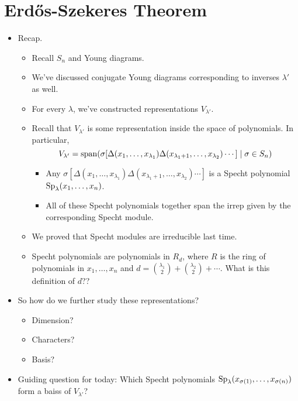 \documentclass[../notes.tex]{subfiles}
\begin{document}
\section{Erd\H{o}s-Szekeres Theorem}
\begin{itemize}
    \item {}Recap.
    \begin{itemize}
        \item Recall $S_n$ and Young diagrams.
        \item We've discussed conjugate Young diagrams corresponding to inverses $\lambda'$ as well.
        \item For every $\lambda$, we've constructed representations $V_{\lambda'}$.
        \item Recall that $V_{\lambda'}$ is some representation inside the space of polynomials. In particular,
        \begin{equation*}
            V_{\lambda'} = \operatorname{span}(\sigma[\Delta(x_1,\dots,x_{\lambda_1})\Delta(x_{\lambda_1+1},\dots,x_{\lambda_2})\cdots]\mid\sigma\in S_n)
        \end{equation*}
        \begin{itemize}
            \item Any $\sigma[\Delta(x_1,\dots,x_{\lambda_1})\Delta(x_{\lambda_1+1},\dots,x_{\lambda_2})\cdots]$ is a Specht polynomial $\operatorname{Sp}_\lambda(x_1,\dots,x_n)$.
            \item All of these Specht polynomials together span the irrep given by the corresponding Specht module.
        \end{itemize}
        \item We proved that Specht modules are irreducible last time.
        \item Specht polynomials are polynomials in $R_d$, where $R$ is the ring of polynomials in $x_1,\dots,x_n$ and $d=\binom{\lambda_1}{2}+\binom{\lambda_2}{2}+\cdots$. What is this definition of $d$??
    \end{itemize}
    \item So how do we further study these representations?
    \begin{itemize}
        \item Dimension?
        \item Characters?
        \item Basis?
    \end{itemize}
    \item Guiding question for today: Which Specht polynomials $\operatorname{Sp}_\lambda(x_{\sigma(1)},\dots,x_{\sigma(n)})$ form a baiss of $V_{\lambda'}$?

\end{itemize}
\end{document}
